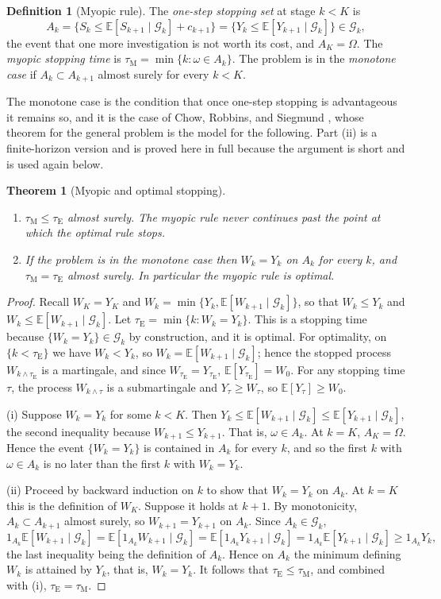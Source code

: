 \documentclass[11pt]{article}
\newcommand{\G}{\mathcal G}
\newcommand{\E}{\mathbb E}
\newcommand{\tE}{\tau_{\mathrm E}}
\newcommand{\tM}{\tau_{\mathrm M}}
\theoremstyle{plain}
\newtheorem{theorem}{Theorem}
\theoremstyle{definition}
\newtheorem{definition}{Definition}
\begin{document}
\begin{definition}[Myopic rule]\label{def:myopic}
The \emph{one-step stopping set} at stage $k<K$ is
\[
A_k=\bigl\{S_k\le\E[S_{k+1}\mid\G_k]+c_{k+1}\bigr\}=\bigl\{Y_k\le\E[Y_{k+1}\mid\G_k]\bigr\}\in\G_k,
\]
the event that one more investigation is not worth its cost, and $A_K=\Omega$. The \emph{myopic stopping time} is $\tM=\min\{k:\omega\in A_k\}$. The problem is in the \emph{monotone case} if $A_k\subset A_{k+1}$ almost surely for every $k<K$.
\end{definition}

The monotone case is the condition that once one-step stopping is advantageous it remains so, and it is the case of Chow, Robbins, and Siegmund \cite{chow1971great}, whose theorem for the general problem is the model for the following. Part (ii) is a finite-horizon version and is proved here in full because the argument is short and is used again below.

\begin{theorem}[Myopic and optimal stopping]\label{thm:myopic}
\begin{enumerate}[label=(\roman*),nosep]
\item $\tM\le\tE$ almost surely. The myopic rule never continues past the point at which the optimal rule stops.
\item If the problem is in the monotone case then $W_k=Y_k$ on $A_k$ for every $k$, and $\tM=\tE$ almost surely. In particular the myopic rule is optimal.
\end{enumerate}
\end{theorem}

\begin{proof}
Recall $W_K=Y_K$ and $W_k=\min\{Y_k,\E[W_{k+1}\mid\G_k]\}$, so that $W_k\le Y_k$ and $W_k\le\E[W_{k+1}\mid\G_k]$. Let $\tE=\min\{k:W_k=Y_k\}$. This is a stopping time because $\{W_k=Y_k\}\in\G_k$ by construction, and it is optimal. For optimality, on $\{k<\tE\}$ we have $W_k<Y_k$, so $W_k=\E[W_{k+1}\mid\G_k]$; hence the stopped process $W_{k\wedge\tE}$ is a martingale, and since $W_{\tE}=Y_{\tE}$, $\E[Y_{\tE}]=W_0$. For any stopping time $\tau$, the process $W_{k\wedge\tau}$ is a submartingale and $Y_\tau\ge W_\tau$, so $\E[Y_\tau]\ge W_0$.

(i) Suppose $W_k=Y_k$ for some $k<K$. Then $Y_k\le\E[W_{k+1}\mid\G_k]\le\E[Y_{k+1}\mid\G_k]$, the second inequality because $W_{k+1}\le Y_{k+1}$. That is, $\omega\in A_k$. At $k=K$, $A_K=\Omega$. Hence the event $\{W_k=Y_k\}$ is contained in $A_k$ for every $k$, and so the first $k$ with $\omega\in A_k$ is no later than the first $k$ with $W_k=Y_k$.

(ii) Proceed by backward induction on $k$ to show that $W_k=Y_k$ on $A_k$. At $k=K$ this is the definition of $W_K$. Suppose it holds at $k+1$. By monotonicity, $A_k\subset A_{k+1}$ almost surely, so $W_{k+1}=Y_{k+1}$ on $A_k$. Since $A_k\in\G_k$,
\[
1_{A_k}\E[W_{k+1}\mid\G_k]=\E[1_{A_k}W_{k+1}\mid\G_k]=\E[1_{A_k}Y_{k+1}\mid\G_k]=1_{A_k}\E[Y_{k+1}\mid\G_k]\ge 1_{A_k}Y_k,
\]
the last inequality being the definition of $A_k$. Hence on $A_k$ the minimum defining $W_k$ is attained by $Y_k$, that is, $W_k=Y_k$. It follows that $\tE\le\tM$, and combined with (i), $\tE=\tM$.
\end{proof}
\end{document}
